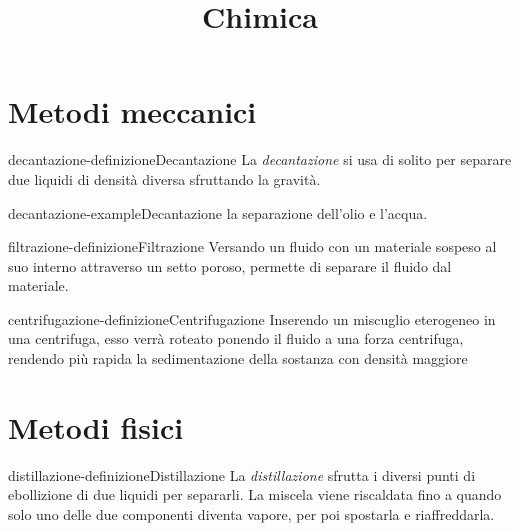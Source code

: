\documentclass[preview]{standalone}
\begin{document}
\title{Chimica}
\genpage

\section{Metodi meccanici}


\begin{snippetdefinition}{decantazione-definizione}{Decantazione}
    La \textit{decantazione} si usa di solito per separare due liquidi di densità diversa
    sfruttando la gravità.
\end{snippetdefinition}

\begin{snippetexample}{decantazione-example}{Decantazione}
    la separazione dell'olio e l'acqua.
\end{snippetexample}

\begin{snippetdefinition}{filtrazione-definizione}{Filtrazione}
    Versando un fluido con un materiale sospeso al suo interno attraverso un setto poroso,
    permette di separare il fluido dal materiale.
\end{snippetdefinition}

\begin{snippetdefinition}{centrifugazione-definizione}{Centrifugazione}
    Inserendo un miscuglio eterogeneo in una centrifuga, esso verrà roteato ponendo il
    fluido a una forza centrifuga, rendendo più rapida la sedimentazione della sostanza con densità maggiore
\end{snippetdefinition}

\section{Metodi fisici}


\begin{snippetdefinition}{distillazione-definizione}{Distillazione}
    La \textit{distillazione} sfrutta i diversi punti di ebollizione di due liquidi per separarli.
    La miscela viene riscaldata fino a quando solo uno delle due componenti diventa vapore, per poi
    spostarla e riaffreddarla.
\end{snippetdefinition}
\end{document}
